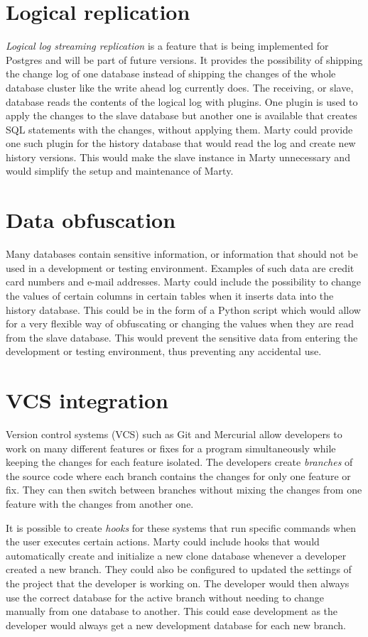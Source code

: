 \section{Logical replication}
\textit{Logical log streaming replication} is a feature that is being implemented for Postgres and will be part of future versions.
It provides the possibility of shipping the change log of one database instead of shipping the changes of the whole database cluster like the write ahead log currently does.
The receiving, or slave, database reads the contents of the logical log with plugins.
One plugin is used to apply the changes to the slave database but another one is available that creates SQL statements with the changes, without applying them.
Marty could provide one such plugin for the history database that would read the log and create new history versions.
This would make the slave instance in Marty unnecessary and would simplify the setup and maintenance of Marty.

\section{Data obfuscation}
Many databases contain sensitive information, or information that should not be used in a development or testing environment.
Examples of such data are credit card numbers and e-mail addresses.
Marty could include the possibility to change the values of certain columns in certain tables when it inserts data into the history database.
This could be in the form of a Python script which would allow for a very flexible way of obfuscating or changing the values when they are read from the slave database.
This would prevent the sensitive data from entering the development or testing environment, thus preventing any accidental use.

\section{VCS integration}
Version control systems (VCS) such as Git and Mercurial allow developers to work on many different features or fixes for a program simultaneously while keeping the changes for each feature isolated.
The developers create \textit{branches} of the source code where each branch contains the changes for only one feature or fix.
They can then switch between branches without mixing the changes from one feature with the changes from another one.

It is possible to create \textit{hooks} for these systems that run specific commands when the user executes certain actions.
Marty could include hooks that would automatically create and initialize a new clone database whenever a developer created a new branch.
They could also be configured to updated the settings of the project that the developer is working on.
The developer would then always use the correct database for the active branch without needing to change manually from one database to another.
This could ease development as the developer would always get a new development database for each new branch.

